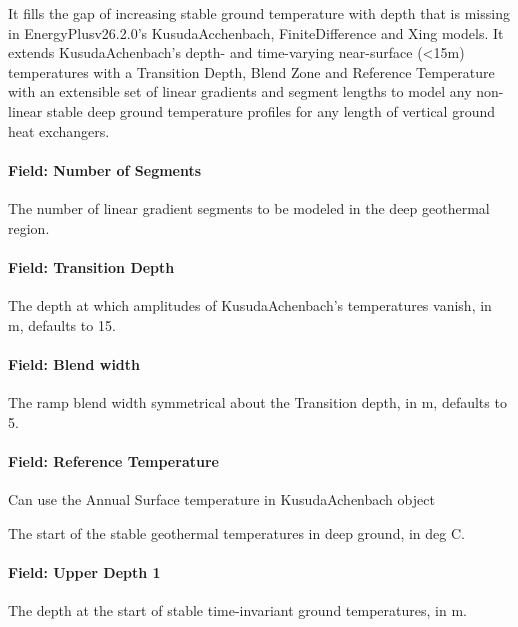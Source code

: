 It fills the gap of increasing stable ground temperature with depth that is missing in EnergyPlusv26.2.0's KusudaAcchenbach, FiniteDifference and Xing models. It extends KusudaAchenbach's depth- and time-varying near-surface (<15m) temperatures with a Transition Depth, Blend Zone and Reference Temperature with an extensible set of linear gradients and segment lengths to model any non-linear stable deep ground temperature profiles for any length of vertical ground heat exchangers. 

\label{inputs-gradientsegments}

\paragraph{Field: Number of Segments}\label{field-number-of-segments}

The number of linear gradient segments to be modeled in the deep geothermal region.

\paragraph{Field: Transition Depth}\label{field-transition-depth}

The depth at which amplitudes of KusudaAchenbach's temperatures vanish, in m, defaults to 15.

\paragraph{Field: Blend width}\label{field-blend-width}

The ramp blend width symmetrical about the Transition depth, in m, defaults to 5. 

\paragraph{Field: Reference Temperature}\label{field-reference-temperatures} Can use the Annual Surface temperature in KusudaAchenbach object

The start of the stable geothermal temperatures in deep ground, in deg C.

\paragraph{Field: Upper Depth 1}\label{field-upper-depth-1}

The depth at the start of stable time-invariant ground temperatures, in m.


